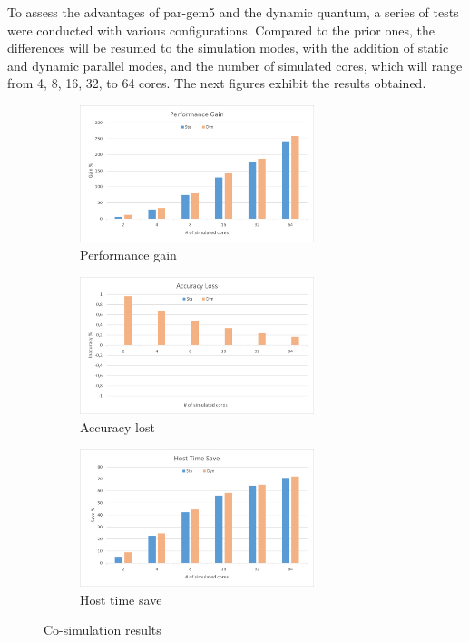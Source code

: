 To assess the advantages of par-gem5 and the dynamic quantum, a series of tests were conducted with various configurations. Compared to the prior 
ones, the differences will be resumed to the simulation modes, with the addition of static and dynamic parallel modes, and the number of simulated 
cores, which will range from 4, 8, 16, 32, to 64 cores. The next figures exhibit the results obtained. 


\begin{figure}[]
	\centering
	\begin{subfigure}{\textwidth}
		\centering
		\includegraphics[width=0.75\textwidth]{Images/Performance_CO_SIM.png}
		\caption{ Performance gain}
	\end{subfigure}
	\begin{subfigure}{\textwidth}
		\centering
		\includegraphics[width=0.75\textwidth]{Images/Accuracy_CO_SIM.png}
		\caption{ Accuracy lost}
	\end{subfigure}
	\begin{subfigure}{\textwidth}
		\centering
		\includegraphics[width=0.75\textwidth]{Images/Host_CO_SIM.png}
		\caption{ Host time save}
	\end{subfigure}
			
	\caption{Co-simulation results}
\end{figure}


